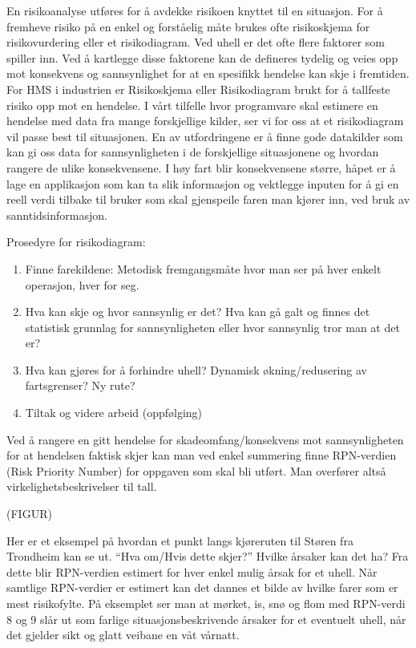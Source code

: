 \documentclass[a4paper,norsk,oneside]{book}
\begin{document}
En risikoanalyse utføres for å avdekke risikoen knyttet til en situasjon. For å fremheve risiko på en enkel og forståelig måte brukes ofte risikoskjema for risikovurdering eller et risikodiagram. Ved uhell er det ofte flere faktorer som spiller inn. Ved å kartlegge disse faktorene kan de defineres tydelig og veies opp mot konsekvens og sannsynlighet for at en spesifikk hendelse kan skje i fremtiden. For HMS i industrien er Risikoskjema eller Risikodiagram brukt for å tallfeste risiko opp mot en hendelse. I vårt tilfelle hvor programvare skal estimere en hendelse med data fra mange forskjellige kilder, ser vi for oss at et risikodiagram vil passe best til situasjonen. En av utfordringene er å finne gode datakilder som kan gi oss data for sannsynligheten i de forskjellige situasjonene og hvordan rangere de ulike konsekvensene. I høy fart blir konsekvensene større, håpet er å lage en applikasjon som kan ta slik informasjon og vektlegge inputen for å gi en reell verdi tilbake til bruker som skal gjenspeile faren man kjører inn, ved bruk av sanntidsinformasjon.

Prosedyre for risikodiagram:
\begin{enumerate}
\item Finne farekildene: Metodisk fremgangsmåte hvor man ser på hver enkelt operasjon, hver for seg.
\item Hva kan skje og hvor sannsynlig er det? Hva kan gå galt og finnes det statistisk grunnlag for sannsynligheten eller hvor sannsynlig tror man at det er?
\item Hva kan gjøres for å forhindre uhell? Dynamisk økning/redusering av fartsgrenser? Ny rute?
\item Tiltak og videre arbeid (oppfølging)
\end{enumerate}

Ved å rangere en gitt hendelse for skadeomfang/konsekvens mot sannsynligheten for at hendelsen faktisk skjer kan man ved enkel summering finne RPN-verdien (Risk Priority Number) for oppgaven som skal bli utført. Man overfører altså virkelighetsbeskrivelser til tall.  

(FIGUR)

Her er et eksempel på hvordan et punkt langs kjøreruten til Støren fra Trondheim kan se ut. “Hva om/Hvis dette skjer?” Hvilke årsaker kan det ha? Fra dette blir RPN-verdien estimert for hver enkel mulig årsak for et uhell. Når samtlige RPN-verdier er estimert kan det dannes et bilde av hvilke farer som er mest risikofylte. På eksemplet ser man at mørket, is, snø og flom med RPN-verdi 8 og 9 slår ut som farlige situasjonsbeskrivende årsaker for et eventuelt uhell, når det gjelder sikt og glatt veibane en våt vårnatt.
\end{document}
